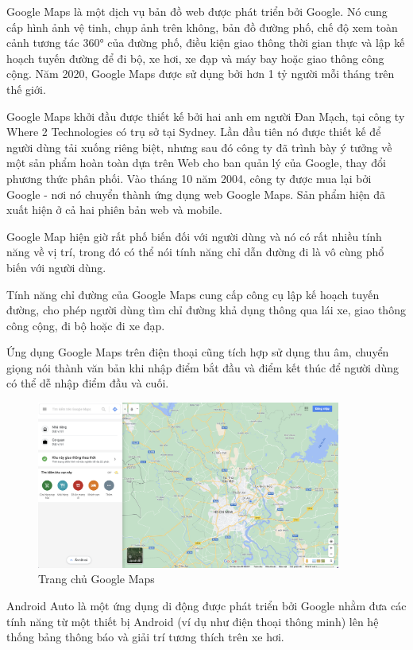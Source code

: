 Google Maps là một dịch vụ bản đồ web được phát triển bởi Google. Nó cung cấp hình ảnh vệ tinh, chụp ảnh trên không, bản đồ đường phố, chế độ xem toàn cảnh tương tác 360° của đường phố, điều kiện giao thông thời gian thực và lập kế hoạch tuyến đường để đi bộ, xe hơi, xe đạp và máy bay hoặc giao thông công cộng. Năm 2020, Google Maps được sử dụng bởi hơn 1 tỷ người mỗi tháng trên thế giới.

Google Maps khởi đầu được thiết kế bởi hai anh em người Đan Mạch, tại công ty Where 2 Technologies có trụ sở tại Sydney. Lần đầu tiên nó được thiết kế để người dùng tải xuống riêng biệt, nhưng sau đó công ty đã trình bày ý tưởng về một sản phẩm hoàn toàn dựa trên Web cho ban quản lý của Google, thay đổi phương thức phân phối. Vào tháng 10 năm 2004, công ty được mua lại bởi Google - nơi nó chuyển thành ứng dụng web Google Maps. Sản phẩm hiện đã xuất hiện ở cả hai phiên bản web và mobile.

Google Map hiện giờ rất phố biến đối với người dùng và nó có rất nhiều tính năng về vị trí, trong đó có thể nói tính năng chỉ dẫn đường đi là vô cùng phổ biến với người dùng.

Tính năng chỉ đường của Google Maps cung cấp công cụ lập kế hoạch tuyến đường, cho phép người dùng tìm chỉ đường khả dụng thông qua lái xe, giao thông công cộng, đi bộ hoặc đi xe đạp.

Ứng dụng Google Maps trên điện thoại cũng tích hợp sử dụng thu âm, chuyển giọng nói thành văn bản khi nhập điểm bắt đầu và điểm kết thúc để người dùng có thể dễ nhập điểm đầu và cuối.

\begin{figure}[H]
    \centering
    \includegraphics[width=10cm]{images/HomePage-GoogleMaps.png}
    \caption{Trang chủ Google Maps}
    \label{fig:homepage-ggmaps}
\end{figure}

Android Auto là một ứng dụng di động được phát triển bởi Google nhằm đưa các tính năng từ một thiết bị Android (ví dụ như điện thoại thông minh) lên hệ thống bảng thông báo và giải trí tương thích trên xe hơi.

